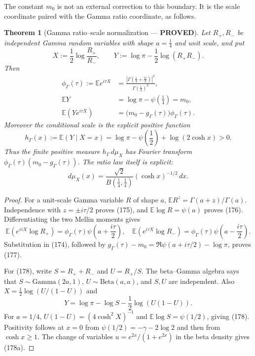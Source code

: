 \documentclass[11pt]{article}
\newtheorem{theorem}{Theorem}
\newcommand{\PROVED}{\textcolor{green!45!black}{\textbf{PROVED}}}
\begin{document}
The constant $m_0$ is not an external correction to this boundary.  It is
the scale coordinate paired with the Gamma ratio coordinate, as follows.

\begin{theorem}[Gamma ratio--scale normalization --- \PROVED]
Let $R_+,R_-$ be independent Gamma random variables with shape
$a=\tfrac14$ and unit scale, and put
\begin{equation}
 X:=\frac12\log\frac{R_+}{R_-},
 \qquad
 Y:=\log\pi-\frac12\log(R_+R_-).                    \tag{174}
\end{equation}
Then
\begin{align}
 \phi_\Gamma(\tau):=\mathbb E e^{i\tau X}
 &=\frac{|\Gamma(\frac14+\frac{i\tau}{2})|^2}
         {\Gamma(\frac14)^2},                       \tag{175}\\
 \mathbb EY&=\log\pi-\psi\left(\frac14\right)=m_0,\tag{176}\\
 \mathbb E\!\left(Ye^{i\tau X}\right)
 &=\bigl(m_0-g_\Gamma(\tau)\bigr)\phi_\Gamma(\tau).
                                                               \tag{177}
\end{align}
Moreover the conditional scale is the explicit positive function
\begin{equation}
 h_\Gamma(x):=\mathbb E(Y\mid X=x)
 =\log\pi-\psi\left(\frac12\right)+\log(2\cosh x)>0. \tag{178}
\end{equation}
Thus the finite positive measure $h_\Gamma\,d\mu_X$ has Fourier transform
$\phi_\Gamma(\tau)(m_0-g_\Gamma(\tau))$.
The ratio law itself is explicit:
\begin{equation}
 d\mu_X(x)=\frac{\sqrt2}{B(\frac14,\frac14)}
             (\cosh x)^{-1/2}\,dx.                  \tag{178a}
\end{equation}
\end{theorem}

\begin{proof}
For a unit-scale Gamma variable $R$ of shape $a$,
$\mathbb E R^z=\Gamma(a+z)/\Gamma(a)$.  Independence with
$z=\pm i\tau/2$ proves (175), and
$\mathbb E\log R=\psi(a)$ proves (176).  Differentiating the two Mellin
moments gives
\[
 \mathbb E\!\left(e^{i\tau X}\log R_+\right)
 =\phi_\Gamma(\tau)\psi\left(a+\frac{i\tau}{2}\right),
 \quad
 \mathbb E\!\left(e^{i\tau X}\log R_-\right)
 =\phi_\Gamma(\tau)\psi\left(a-\frac{i\tau}{2}\right).
\]
Substitution in (174), followed by
$g_\Gamma(\tau)-m_0=\Re\psi(a+i\tau/2)-\log\pi$, proves (177).

For (178), write $S=R_++R_-$ and $U=R_+/S$.  The beta--Gamma algebra says
that $S\sim\mathrm{Gamma}(2a,1)$, $U\sim\mathrm{Beta}(a,a)$, and $S,U$
are independent.  Also
$X=\tfrac12\log(U/(1-U))$ and
\[
 Y=\log\pi-\log S-\frac12\log(U(1-U)).
\]
For $a=1/4$, $U(1-U)=(4\cosh^2X)^{-1}$ and
$\mathbb E\log S=\psi(1/2)$, giving (178).  Positivity follows at
$x=0$ from $\psi(1/2)=-\gamma-2\log2$ and then from $\cosh x\ge1$.
The change of variables $u=e^{2x}/(1+e^{2x})$ in the beta density gives
(178a).
\end{proof}
\end{document}
